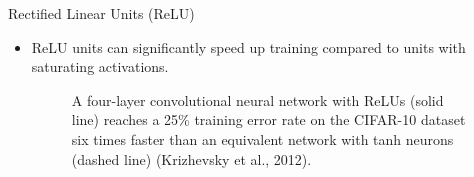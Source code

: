 \begin{frame} {Rectified Linear Units (ReLU)}
  \begin{itemize}
    \item ReLU units can significantly speed up training compared to units with saturating activations.
    \begin{figure}
    \centering
      \caption{\footnotesize A four-layer convolutional neural network with ReLUs (solid line) reaches a 25\% 
training error rate on the CIFAR-10 dataset six times faster than an equivalent network with tanh neurons (dashed line) (Krizhevsky et al., 2012). }
    \end{figure}
  \end{itemize}
\end{frame}

